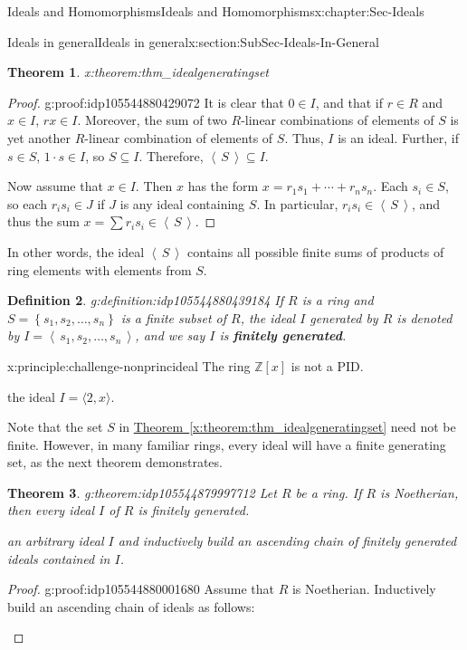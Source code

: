 \documentclass[oneside,10pt,]{book}
\newcommand{\xreffont}{\relax}
\newcommand{\terminology}[1]{\textbf{#1}}
\numberwithin{equation}{section}
\newcommand{\ideal}[1]{\left\langle\, #1 \,\right\rangle}
\newcommand{\set}[1]{\left\{ {#1} \right\}}
\def\Z{{\mathbb Z}}
\newtheorem{theorem}{Theorem}[section]
\newtheorem{definition}[theorem]{Definition}
\begin{document}
\begin{chapterptx}{Ideals and Homomorphisms}{}{Ideals and Homomorphisms}{}{}{x:chapter:Sec-Ideals}
\begin{sectionptx}{Ideals in general}{}{Ideals in general}{}{}{x:section:SubSec-Ideals-In-General}
\begin{theorem}{}{}{x:theorem:thm_idealgeneratingset}
%
\end{theorem}
\begin{proof}{}{g:proof:idp105544880429072}
It is clear that \(0\in I\), and that if \(r\in R\) and \(x\in I\), \(rx\in I\). Moreover, the sum of two \(R\)-linear combinations of elements of \(S\) is yet another \(R\)-linear combination of elements of \(S\). Thus, \(I\) is an ideal. Further, if \(s\in S\), \(1\cdot s \in I\), so \(S\subseteq I\). Therefore, \(\ideal{S}\subseteq I\).%
\par
Now assume that \(x\in I\). Then \(x\) has the form \(x = r_1 s_1 + \cdots + r_n s_n\). Each \(s_i \in S\), so each \(r_i s_i \in J\) if \(J\) is any ideal containing \(S\). In particular, \(r_i s_i \in \ideal{S}\), and thus the sum \(x = \sum r_i s_i \in \ideal{S}\).%
\end{proof}
In other words, the ideal \(\ideal{S}\) contains all possible finite sums of products of ring elements with elements from \(S\).%
\begin{definition}{}{g:definition:idp105544880439184}%
If \(R\) is a ring and \(S = \set{s_1, s_2, \ldots,
s_n}\) is a finite subset of \(R\), the ideal \(I\) generated by \(R\) is denoted by \(I = \ideal{s_1, s_2, \ldots,
s_n}\), and we say \(I\) is \terminology{finitely generated}.%
\end{definition}
\begin{principle}{}{}{x:principle:challenge-nonprincideal}%
The ring \(\Z[x]\) is not a PID.%
\par\smallskip%
\noindentConsider the ideal \(I = \langle 2, x \rangle\).%
\end{principle}
Note that the set \(S\) in \hyperref[x:theorem:thm_idealgeneratingset]{Theorem~{\xreffont\ref{x:theorem:thm_idealgeneratingset}}} need not be finite. However, in many familiar rings, every ideal will have a finite generating set, as the next theorem demonstrates.%
\begin{theorem}{}{}{g:theorem:idp105544879997712}%
Let \(R\) be a ring. If \(R\) is Noetherian\footnotemark{}, then every ideal \(I\) of \(R\) is finitely generated.%
\par\smallskip%
\noindentConsider an arbitrary ideal \(I\) and inductively build an ascending chain of finitely generated ideals contained in \(I\).%
\end{theorem}
\begin{proof}{}{g:proof:idp105544880001680}
Assume that \(R\) is Noetherian. Inductively build an ascending chain of ideals as follows:%
\begin{itemize}[label=\textbullet]

\end{itemize}
\end{proof}
\end{sectionptx}
\end{chapterptx}
\end{document}
